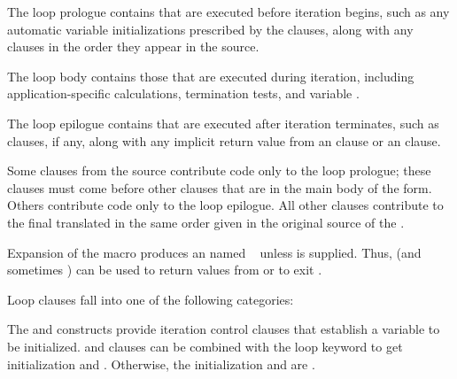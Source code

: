 \beginlist
{}
 
The loop prologue contains  
that are executed before iteration begins, such as
any automatic variable initializations prescribed 
by the  clauses, along with any  clauses
in the order they appear in the source.
 
 
The loop body contains those  that are executed during iteration, 
including application-specific calculations, termination tests,
and variable .
                           
 
The loop epilogue contains  that are executed after iteration 
terminates, such as  clauses, if any, along
with any implicit return value from an  clause or
an  clause.

\endlist
 
Some clauses from the source 
contribute code only to the loop prologue; these clauses must
  come before other clauses that are in the main body of the  form.            
  Others contribute code only to the loop epilogue.
  All other clauses contribute to the final 
translated  in the same 
  order given in the original source  of the .

Expansion of the  macro produces an  named \nil\ 
unless  is supplied.
Thus,  (and sometimes )
can be used to return values from  or to exit .

\endsubsubsection%

 
Loop clauses fall into one of the following categories:
 

The  and  constructs provide iteration control clauses
that establish a variable to be initialized.
 and  clauses can be combined with the loop
keyword \loopref{and} to get \term{parallel} initialization and .
Otherwise, the initialization and \term{stepping}\meaning{1} are \term{sequential}.


